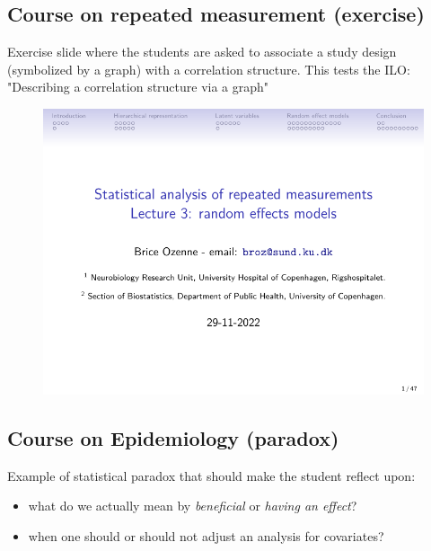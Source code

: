 \documentclass[12pt]{article}
\begin{document}
\subsection{Course on repeated measurement (exercise)}
\label{appendix-quizz}
Exercise slide where the students are asked to associate a study
design (symbolized by a graph) with a correlation structure. This
tests the ILO: "Describing a correlation structure via a graph"
\begin{figure}[!h]
\centering
\includegraphics[trim={0 0 0 0}, page = 21, width=1\textwidth]{./figures/repMes-randomEffects-lecture.pdf}
\label{fig:lmm-slide-wiw}
\end{figure}

\clearpage

\subsection{Course on Epidemiology (paradox)}
\label{appendix-paradox}
Example of statistical paradox that should make the student reflect
upon:
\begin{itemize}
\item what do we actually mean by \emph{beneficial} or \emph{having an effect}?
\item when one should or should not adjust an analysis for covariates?
\end{itemize}
\end{document}
